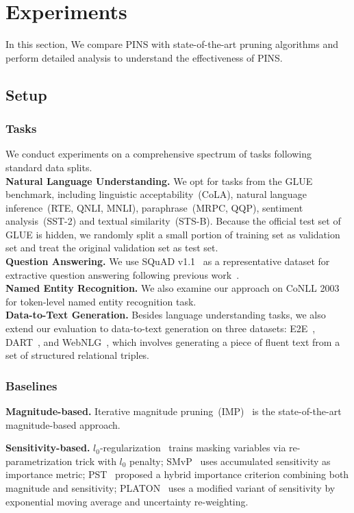 \section{Experiments}
In this section,  We compare PINS with state-of-the-art pruning algorithms and perform detailed analysis  to understand the effectiveness of PINS.
\subsection{Setup}
\subsubsection{Tasks}
We conduct experiments on a comprehensive spectrum of tasks following standard data splits. \\
\textbf{Natural Language Understanding. } We opt for tasks from the GLUE~\cite{glue} benchmark, including linguistic acceptability~(CoLA), natural language inference~(RTE, QNLI, MNLI), paraphrase~(MRPC, QQP), sentiment analysis~(SST-2) and textual similarity~(STS-B). Because the official test set of GLUE is hidden, we randomly split a small portion of training set as validation set and treat the original validation set as test set. \\
\textbf{Question Answering. } We use SQuAD v1.1~\cite{squad} as a representative dataset for extractive question answering following previous work~\cite{platon}. \\
\textbf{Named Entity Recognition. } We also examine our approach on CoNLL 2003~\cite{conll2003} for token-level named entity recognition task. \\
\textbf{Data-to-Text Generation.} Besides language understanding tasks, we also extend our evaluation to data-to-text generation on three datasets: E2E~\cite{e2e}, DART~\cite{dart}, and WebNLG~\cite{webnlg}, which involves generating a piece of fluent text from  a set of structured relational triples. \\



\subsubsection{Baselines}
\textbf{Magnitude-based.} Iterative magnitude pruning~(IMP)~\cite{gupta} is the state-of-the-art magnitude-based approach.

\noindent
\textbf{Sensitivity-based.} $l_0$-regularization~\cite{l0} trains masking variables via re-parametrization trick with $l_0$ penalty; SMvP~\cite{movement} uses accumulated sensitivity as importance metric; PST~\cite{pst} proposed a hybrid importance criterion combining both magnitude and sensitivity; PLATON~\cite{platon} uses a modified variant of sensitivity by exponential moving average and uncertainty re-weighting.

